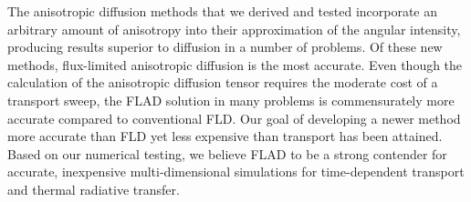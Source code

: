 The anisotropic diffusion methods that we derived and tested incorporate an
arbitrary amount of anisotropy into their approximation of the angular
intensity, producing results superior to diffusion in a number of problems. Of
these new methods, flux-limited anisotropic diffusion is the most accurate.
Even though the calculation of the anisotropic diffusion tensor
requires the moderate cost of a transport sweep, the FLAD solution in many
problems is commensurately more accurate compared to conventional FLD. Our
goal of developing a newer method more accurate than FLD yet less expensive
than transport has been attained. Based on
our numerical testing, we believe FLAD to be a strong contender for
accurate, inexpensive multi-dimensional simulations for time-dependent
transport and thermal radiative transfer.

